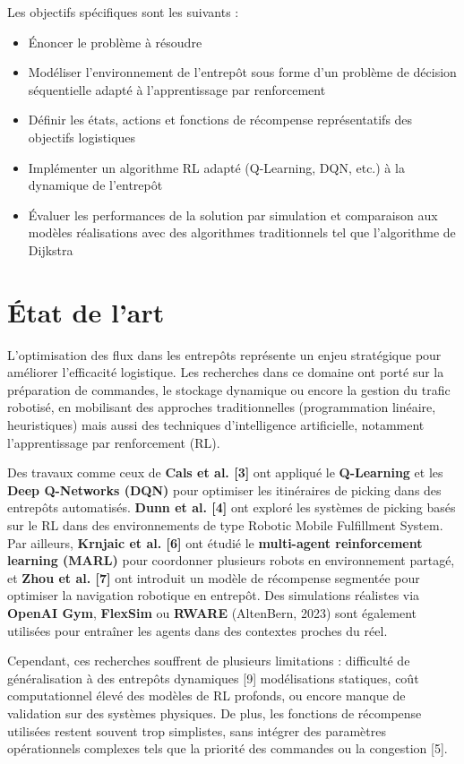 \documentclass{article}
\begin{document}
Les objectifs spécifiques sont les suivants :
\begin{itemize}
    \item Énoncer le problème à résoudre
    \item Modéliser l'environnement de l'entrepôt sous forme d'un problème de décision séquentielle adapté à l'apprentissage par renforcement
    \item Définir les états, actions et fonctions de récompense représentatifs des objectifs logistiques
    \item Implémenter un algorithme RL adapté (Q-Learning, DQN, etc.) à la dynamique de l'entrepôt
    \item Évaluer les performances de la solution par simulation et comparaison aux modèles réalisations avec des algorithmes traditionnels tel que l'algorithme de Dijkstra
\end{itemize}

\section{État de l'art}
L'optimisation des flux dans les entrepôts représente un enjeu stratégique pour améliorer l'efficacité logistique. Les recherches dans ce domaine ont porté sur la préparation de commandes, le stockage dynamique ou encore la gestion du trafic robotisé, en mobilisant des approches traditionnelles (programmation linéaire, heuristiques) mais aussi des techniques d'intelligence artificielle, notamment l'apprentissage par renforcement (RL).

Des travaux comme ceux de \textbf{Cals et al. [3]} ont appliqué le \textbf{Q-Learning} et les \textbf{Deep Q-Networks (DQN)} pour optimiser les itinéraires de picking dans des entrepôts automatisés. \textbf{Dunn et al. [4]} ont exploré les systèmes de picking basés sur le RL dans des environnements de type Robotic Mobile Fulfillment System. Par ailleurs, \textbf{Krnjaic et al. [6]} ont étudié le \textbf{multi-agent reinforcement learning (MARL)} pour coordonner plusieurs robots en environnement partagé, et \textbf{Zhou et al. [7]} ont introduit un modèle de récompense segmentée pour optimiser la navigation robotique en entrepôt. Des simulations réalistes via \textbf{OpenAI Gym}, \textbf{FlexSim} ou \textbf{RWARE} (AltenBern, 2023) sont également utilisées pour entraîner les agents dans des contextes proches du réel.

Cependant, ces recherches souffrent de plusieurs limitations : difficulté de généralisation à des entrepôts dynamiques [9] modélisations statiques, coût computationnel élevé des modèles de RL profonds, ou encore manque de validation sur des systèmes physiques. De plus, les fonctions de récompense utilisées restent souvent trop simplistes, sans intégrer des paramètres opérationnels complexes tels que la priorité des commandes ou la congestion [5].
\end{document}
